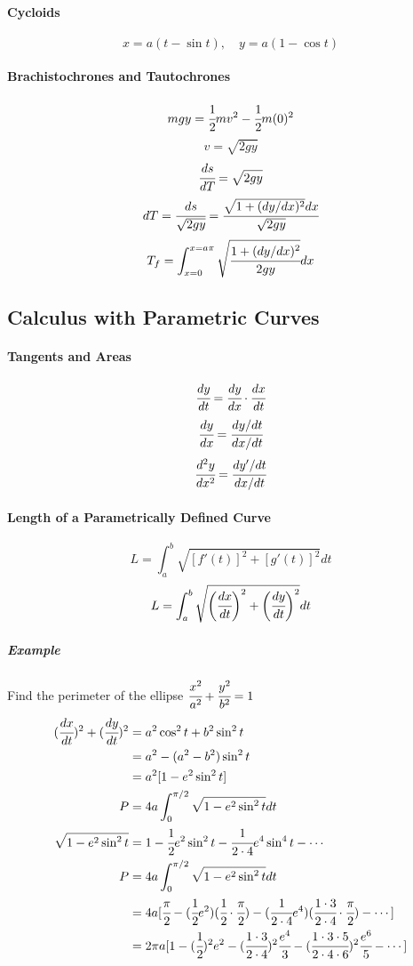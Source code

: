 \documentclass{article}
\begin{document}
            \paragraph{Cycloids}
                \[x=a(t-\sin t),\quad y=a(1-\cos t)\]
            \paragraph{Brachistochrones and Tautochrones}
                \[mgy=\cfrac{1}{2}mv^2-\cfrac{1}{2}m(0)^2\]
                \[v=\sqrt{2gy}\]
                \[\cfrac{ds}{dT}=\sqrt{2gy}\]
                \[dT=\cfrac{ds}{\sqrt{2gy}}=\cfrac{\sqrt{1+(dy/dx)^2}dx}{\sqrt{2gy}}\]
                \[T_f=\int_{x=0}^{x=a\pi}\sqrt{\cfrac{1+(dy/dx)^2}{2gy}}dx\]
        \subsection{Calculus with Parametric Curves}
            \paragraph{Tangents and Areas}
                \[\cfrac{dy}{dt}=\cfrac{dy}{dx}\cdot\cfrac{dx}{dt}\]
                \[\cfrac{dy}{dx}=\cfrac{dy/dt}{dx/dt}\]
                \[\cfrac{d^2y}{dx^2}=\cfrac{dy'/dt}{dx/dt}\]
            \paragraph{Length of a Parametrically Defined Curve}
                \[L=\int_a^b\sqrt{[f'(t)]^2+[g'(t)]^2}dt\]
                \[L=\int_a^b\sqrt{\bigg(\cfrac{dx}{dt}\bigg)^2+\bigg(\cfrac{dy}{dt}\bigg)^2}dt\]
                \subparagraph{Example} Find the perimeter of the ellipse $\cfrac{x^2}{a^2}+\cfrac{y^2}{b^2}=1$
                \begin{equation}
                    \begin{aligned}
                        (\cfrac{dx}{dt})^2+(\cfrac{dy}{dt})^2&=a^2\cos^2 t+b^2\sin^2t\\
                        &=a^2-(a^2-b^2)\sin^2t\\
                        &=a^2[1-e^2\sin^2t]\\
                        P&=4a\int_0^{\pi/2}\sqrt{1-e^2\sin^2t}dt\\
                        \sqrt{1-e^2\sin^2t}&=1-\cfrac{1}{2}e^2\sin^2t-\cfrac{1}{2\cdot 4}e^4\sin^4t-\cdots\\
                        P&=4a\int_0^{\pi/2}\sqrt{1-e^2\sin^2t}dt\\
                        &=4a[\cfrac{\pi}{2}-(\cfrac{1}{2}e^2)(\cfrac{1}{2}\cdot\cfrac{\pi}{2})-(\cfrac{1}{2\cdot 4}e^4)(\cfrac{1\cdot 3}{2\cdot 4}\cdot\cfrac{\pi}{2})-\cdots]\\
                        &=2\pi a[1-(\cfrac{1}{2})^2e^2-(\cfrac{1\cdot 3}{2\cdot 4})^2\cfrac{e^4}{3}-(\cfrac{1\cdot 3\cdot 5}{2\cdot 4\cdot 6})^2\cfrac{e^6}{5}-\cdots]
                    \end{aligned}
                \end{equation}
\end{document}
